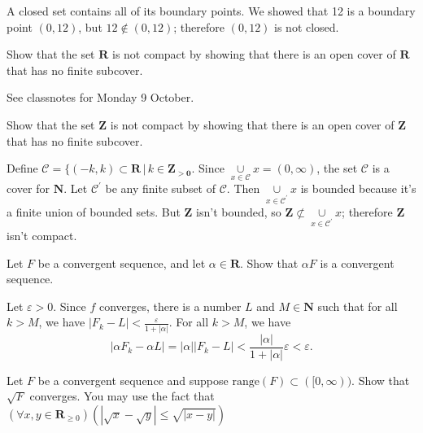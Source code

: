 \documentclass[12pt, fleqn, answers]{exam}
\newcommand{\reals}{\mathbf{R}}
\newcommand{\integers}{\mathbf{Z}}
\newcommand{\range}{\mathrm{range}}
\begin{document}
\begin{questions}
\begin{solution}%
A closed set contains all of its boundary points. We showed that 12 is a boundary point \((0,12)\), but
\(12 \notin (0,12)\); therefore \((0,12)\) is not closed.
\end{solution}


\question  Show that the set \(\reals\) is not compact by 
showing that there is an open cover of \( \reals \) that has no
finite subcover.

\begin{solution} See classnotes for Monday 9 October.

\end{solution}

\question  Show that the set \(\mathbf{Z}\) is not compact by 
showing that there is an open cover of \( \mathbf{Z} \) that has no
finite subcover.

\begin{solution}%
  Define \(\mathcal{C} = \{(-k,k) \subset \reals \, | \, k \in \mathbf{\integers_{>0}}\). Since 
  \(\underset{x \in \mathcal{C}}{\cup} x = (0,\infty)\), the set \(\mathcal{C}\)
is a cover for  \(\mathbf{N}\). Let  \(\mathcal{C}^\prime\) be any finite subset
of  \(\mathcal{C}\). Then \(\underset{x \in \mathcal{C}^\prime}{\cup} x\) is
bounded because it's a finite union of bounded sets.  But \(\mathbf{\integers}\) isn't
bounded, so \(\mathbf{\integers} \not \subset \underset{x \in \mathcal{C}^\prime}{\cup} x\);
therefore \(\mathbf{\integers}\) isn't compact.
\end{solution}


\question Let \(F\) be a convergent sequence, and let \(\alpha \in
\reals\).  Show that \(\alpha F\) is a convergent sequence.



\begin{solution}%
Let \(\varepsilon > 0\). Since \(f\) converges, there is a number \(L\) and 
\(M \in \mathbf{N}\) such that for all \(k > M\), we have \(|F_k - L| < \frac{\varepsilon}{1 + |\alpha|}\).
For all \(k > M\), we have
\[
  |\alpha F_k - \alpha L| = |\alpha| |F_k - L|
                          < \frac{ |\alpha|}{1 + |\alpha|} \varepsilon
                          < \varepsilon.
\]

\end{solution}

\question Let $F$ be a convergent sequence and suppose $\range(F) \subset([0,\infty))$. Show that $\sqrt{F}$ converges.
You may use the fact that $\left(\forall x,y \in \reals_{\geq 0}\right)  (| \sqrt{x} - \sqrt{y} | \leq \sqrt{|x - y|} )$


\end{questions}
\end{document}
